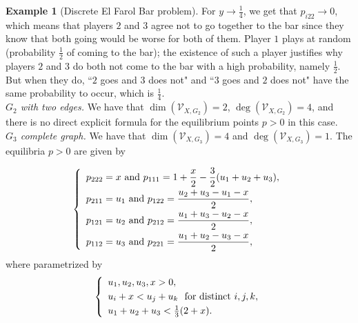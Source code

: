 \documentclass[11pt]{amsart}
\numberwithin{equation}{section}
\theoremstyle{plain}
\numberwithin{theorem}{section}
\theoremstyle{definition}
\newtheorem{example}[theorem]{Example}
\begin{document}
\begin{example}[Discrete El Farol Bar problem]
For $y \rightarrow \frac14$, we get that $p_{i22} \rightarrow 0$, which means that players $2$ and $3$ agree not to go together to the bar since they know that both going would be worse for both of them. Player $1$ plays at random (probability $\frac12$ of coming to the bar); the existence of such a player justifies why players $2$ and $3$ do both not come to the bar with a high probability, namely $\frac12$. But when they do, ``$2$ goes and $3$ does not" and ``$3$ goes and $2$ does not" have the same probability to occur, which is $\frac14$.\\
\indent \emph{$G_2$ with two edges.} We have that $\dim(\mathcal V_{X,G_2})=2$, $\deg(\mathcal V_{X,G_2})=4$, and there is no direct  explicit formula for the equilibrium points $p>0$ in this case. \\ 
\indent \emph{$G_3$ complete graph.} We have that $\dim(\mathcal V_{X,G_3})=4$ and $\deg(\mathcal V_{X,G_3})=1$. The equilibria $p>0$ are given by

$$\left\{\begin{array}{l}
 \vspace*{1mm}     p_{222}=x\text{ and }p_{111}=1+\dfrac x2-\dfrac32(u_1+u_2+u_3),\\
 \vspace*{1mm}     p_{211}=u_1\text{ and }p_{122}=\dfrac{u_2+u_3-u_1-x}2,\\
\vspace*{1mm}     p_{121}=u_2\text{ and }p_{212}=\dfrac{u_1+u_3-u_2-x}2,\\
      p_{112}=u_3\text{ and }p_{221}=\dfrac{u_1+u_2-u_3-x}2,
\end{array}\right.$$
        where
        parametrized by $$\left\{\begin{array}{l}
 \vspace*{1mm}     u_1,u_2,u_3,x>0, \\
\vspace*{1mm}     u_i+x<u_j+u_k\,\,\text{ for distinct }i,j,k,\\
      u_1+u_2+u_3<\frac13(2+x).
\end{array}\right.$$


\end{example}
\end{document}
